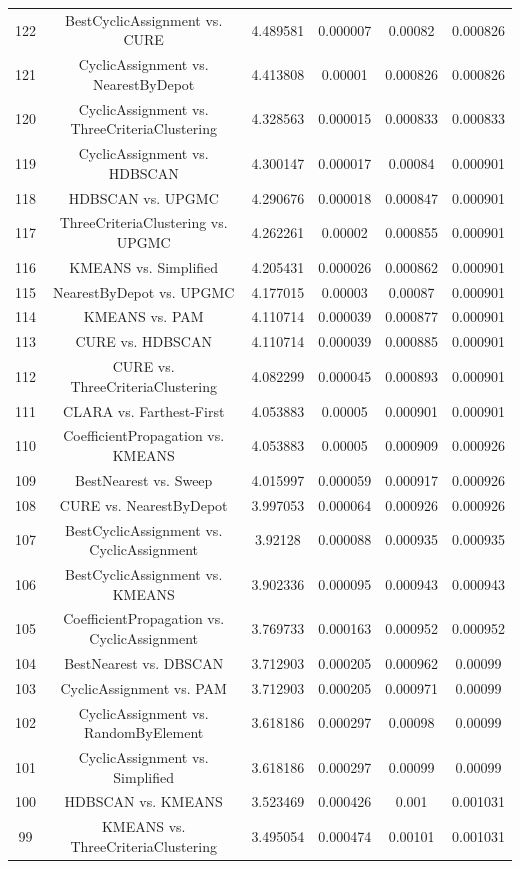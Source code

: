 \documentclass[a4paper,10pt]{article}
\begin{document}
\begin{landscape}
\begin{table}[!htp]
\begin{tabular}{cccccc}
122&BestCyclicAssignment vs. CURE&4.489581&0.000007&0.00082&0.000826\\
121&CyclicAssignment vs. NearestByDepot&4.413808&0.00001&0.000826&0.000826\\
120&CyclicAssignment vs. ThreeCriteriaClustering&4.328563&0.000015&0.000833&0.000833\\
119&CyclicAssignment vs. HDBSCAN&4.300147&0.000017&0.00084&0.000901\\
118&HDBSCAN vs. UPGMC&4.290676&0.000018&0.000847&0.000901\\
117&ThreeCriteriaClustering vs. UPGMC&4.262261&0.00002&0.000855&0.000901\\
116&KMEANS vs. Simplified&4.205431&0.000026&0.000862&0.000901\\
115&NearestByDepot vs. UPGMC&4.177015&0.00003&0.00087&0.000901\\
114&KMEANS vs. PAM&4.110714&0.000039&0.000877&0.000901\\
113&CURE vs. HDBSCAN&4.110714&0.000039&0.000885&0.000901\\
112&CURE vs. ThreeCriteriaClustering&4.082299&0.000045&0.000893&0.000901\\
111&CLARA vs. Farthest-First&4.053883&0.00005&0.000901&0.000901\\
110&CoefficientPropagation vs. KMEANS&4.053883&0.00005&0.000909&0.000926\\
109&BestNearest vs. Sweep&4.015997&0.000059&0.000917&0.000926\\
108&CURE vs. NearestByDepot&3.997053&0.000064&0.000926&0.000926\\
107&BestCyclicAssignment vs. CyclicAssignment&3.92128&0.000088&0.000935&0.000935\\
106&BestCyclicAssignment vs. KMEANS&3.902336&0.000095&0.000943&0.000943\\
105&CoefficientPropagation vs. CyclicAssignment&3.769733&0.000163&0.000952&0.000952\\
104&BestNearest vs. DBSCAN&3.712903&0.000205&0.000962&0.00099\\
103&CyclicAssignment vs. PAM&3.712903&0.000205&0.000971&0.00099\\
102&CyclicAssignment vs. RandomByElement&3.618186&0.000297&0.00098&0.00099\\
101&CyclicAssignment vs. Simplified&3.618186&0.000297&0.00099&0.00099\\
100&HDBSCAN vs. KMEANS&3.523469&0.000426&0.001&0.001031\\
99&KMEANS vs. ThreeCriteriaClustering&3.495054&0.000474&0.00101&0.001031\\

\end{tabular}
\end{table}
\end{landscape}
\end{document}
